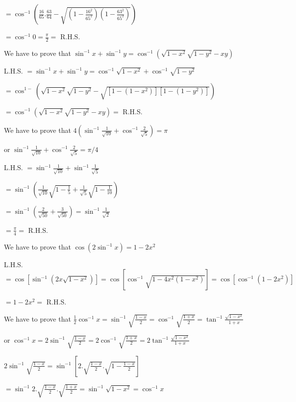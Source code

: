   $= \cos^{-1}\left(\frac{16}{65}.\frac{63}{64} - \sqrt{\left(1 - \frac{16^2}{65^2}\right)\left(1 -
    \frac{63^2}{65^2}\right)}\right)$

  $= \cos^{-1}0 = \frac{\pi}{2} =$ R.H.S.

\item We have to prove that $\sin^{-1}x + \sin^{-1}y = \cos^{-1}\left(\sqrt{1 - x^2}\sqrt{1 - y^2} - xy\right)$

  L.H.S. $= \sin^{-1}x + \sin^{-1}y = \cos^{-1}\sqrt{1 - x^2} + \cos^{-1}\sqrt{1 - y^2}$

  $= \cos^{1-}(\sqrt{1 - x^2}\sqrt{1 - y^2} - \sqrt{[1 - (1 - x^2)][1 - (1 - y^2)]})$

  $= \cos^{-1}\left(\sqrt{1 - x^2}\sqrt{1 - y^2} - xy\right) =$ R.H.S.

\item We have to prove that $4\left(\sin^{-1}\frac{1}{\sqrt{10}} + \cos^{-1}\frac{2}{\sqrt{5}}\right) =\pi$

  or $\sin^{-1}\frac{1}{\sqrt{10}} + \cos^{-1}\frac{2}{\sqrt{5}} =\pi/4$

  L.H.S. $= \sin^{-1}\frac{1}{\sqrt{10}} + \sin^{-1}\frac{1}{\sqrt{5}}$

  $= \sin^{-1}\left(\frac{1}{\sqrt{10}}\sqrt{1 - \frac{1}{5}} + \frac{1}{\sqrt{5}}\sqrt{1 - \frac{1}{10}}\right)$

  $= \sin^{-1}\left(\frac{2}{\sqrt{50}} + \frac{3}{\sqrt{50}}\right) = \sin^{-1}\frac{1}{\sqrt{2}}$

  $= \frac{\pi}{4} =$ R.H.S.

\item We have to prove that $\cos(2\sin^{-1}x) = 1 - 2x^2$

  L.H.S. $= \cos[\sin^{-1}(2x\sqrt{1 - x^2})] = \cos[\cos^{-1}\sqrt{1 - 4x^2(1 - x^2)}] = \cos[\cos^{-1}(1 - 2x^2)]$

  $= 1 - 2x^2 =$ R.H.S.

\item We have to prove that $\frac{1}{2}\cos^{-1}x = \sin^{-1}\sqrt{\frac{1 - x}{2}} = \cos^{-1}\sqrt{\frac{1 + x}{2}} =
  \tan^{-1}\frac{\sqrt{1 - x^2}}{1 + x}$

  or $\cos^{-1}x = 2\sin^{-1}\sqrt{\frac{1 - x}{2}} = 2\cos^{-1}\sqrt{\frac{1 + x}{2}} = 2\tan^{-1}\frac{\sqrt{1 -
      x^2}}{1 + x}$

  $2\sin^{-1}\sqrt{\frac{1 - x}{2}} = \sin^{-1}\left[2.\sqrt{\frac{1 - x}{2}}.\sqrt{1 - \frac{1 - x}{2}}\right]$

  $= \sin^{-1}2.\sqrt{\frac{1 - x}{2}}.\sqrt{\frac{1 + x}{2}} = \sin^{-1}\sqrt{1 - x^2} = \cos^{-1}x$

